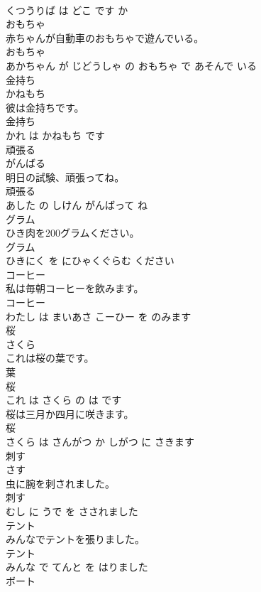 \documentclass[8pt]{extreport}
\begin{document}
\begin{CJK}{UTF8}{min}
\\	くつうりば は どこ です か			
\\	おもちゃ	
\\	赤ちゃんが自動車のおもちゃで遊んでいる。	
\\	おもちゃ 
\\	あかちゃん が じどうしゃ の おもちゃ で あそんで いる			
\\	金持ち	
\\	かねもち			
\\	彼は金持ちです。	
\\	金持ち 
\\	かれ は かねもち です			
\\	頑張る	
\\	がんばる			
\\	明日の試験、頑張ってね。	
\\	頑張る 
\\	あした の しけん がんばって ね			
\\	グラム	
\\	ひき肉を200グラムください。	
\\	グラム 
\\	ひきにく を にひゃくぐらむ ください			
\\	コーヒー	
\\	私は毎朝コーヒーを飲みます。	
\\	コーヒー 
\\	わたし は まいあさ こーひー を のみます			
\\	桜	
\\	さくら			
\\	これは桜の葉です。	
\\	葉 
\\	桜 
\\	これ は さくら の は です			
\\	桜は三月か四月に咲きます。	
\\	桜 
\\	さくら は さんがつ か しがつ に さきます			
\\	刺す	
\\	さす			
\\	虫に腕を刺されました。	
\\	刺す 
\\	むし に うで を さされました			
\\	テント	
\\	みんなでテントを張りました。	
\\	テント 
\\	みんな で てんと を はりました			
\\	ボート	

\end{CJK}
\end{document}
